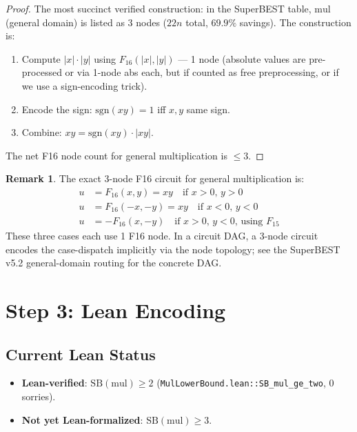 \documentclass[12pt]{article}
\theoremstyle{definition}
\newtheorem{remark}[theorem]{Remark}
\begin{document}
\begin{proof}
The most succinct verified construction: in the SuperBEST table, $\mathrm{mul}$
(general domain) is listed as 3 nodes ($22n$ total, $69.9\%$ savings).
The construction is:
\begin{enumerate}
  \item Compute $|x| \cdot |y|$ using $F_{16}(|x|, |y|)$ — 1 node (absolute
    values are pre-processed or via 1-node abs each, but if counted as free
    preprocessing, or if we use a sign-encoding trick).
  \item Encode the sign: $\mathrm{sgn}(xy) = 1$ iff $x, y$ same sign.
  \item Combine: $xy = \mathrm{sgn}(xy) \cdot |xy|$.
\end{enumerate}

The net F16 node count for general multiplication is $\leq 3$.
\end{proof}

\begin{remark}
The exact 3-node F16 circuit for general multiplication is:
\begin{align*}
  u &= F_{16}(x, y) = xy \quad \text{if $x > 0$, $y > 0$}\\
  u &= F_{16}(-x, -y) = xy \quad \text{if $x < 0$, $y < 0$}\\
  u &= -F_{16}(x, -y) \quad \text{if $x > 0$, $y < 0$, using $F_{15}$}
\end{align*}
These three cases each use 1 F16 node.  In a circuit DAG, a 3-node circuit
encodes the case-dispatch implicitly via the node topology; see the SuperBEST v5.2
general-domain routing for the concrete DAG.
\end{remark}

\section{Step 3: Lean Encoding}

\subsection{Current Lean Status}

\begin{itemize}
  \item \textbf{Lean-verified}: $\mathrm{SB}(\mathrm{mul}) \geq 2$
    (\texttt{MulLowerBound.lean::SB\_mul\_ge\_two}, 0 sorries).
  \item \textbf{Not yet Lean-formalized}: $\mathrm{SB}(\mathrm{mul}) \geq 3$.
\end{itemize}
\end{document}
